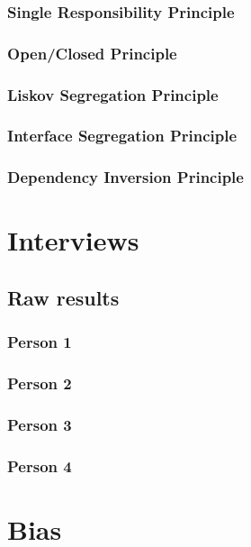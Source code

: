 \subsubsection{Single Responsibility Principle}

\subsubsection{Open/Closed Principle}

\subsubsection{Liskov Segregation Principle}

\subsubsection{Interface Segregation Principle}

\subsubsection{Dependency Inversion Principle}


\section{Interviews}

\subsection{Raw results}

\subsubsection{Person 1}
\subsubsection{Person 2}
\subsubsection{Person 3}
\subsubsection{Person 4}


\section{Bias}
